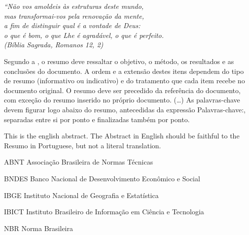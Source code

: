\begin{epigrafe}
    \vspace*{\fill}
	\begin{flushright}
		\textit{``Não vos amoldeis às estruturas deste mundo, \\
		mas transformai-vos pela renovação da mente, \\
		a fim de distinguir qual é a vontade de Deus: \\
		o que é bom, o que Lhe é agradável, o que é perfeito.\\
		(Bíblia Sagrada, Romanos 12, 2)}
	\end{flushright}
\end{epigrafe}


\begin{resumo}
 Segundo a , o resumo deve ressaltar o
 objetivo, o método, os resultados e as conclusões do documento. A ordem e a extensão
 destes itens dependem do tipo de resumo (informativo ou indicativo) e do
 tratamento que cada item recebe no documento original. O resumo deve ser
 precedido da referência do documento, com exceção do resumo inserido no
 próprio documento. (\ldots) As palavras-chave devem figurar logo abaixo do
 resumo, antecedidas da expressão Palavras-chave:, separadas entre si por
 ponto e finalizadas também por ponto.
\end{resumo}

\begin{Abstract}
 This is the english abstract. The Abstract in English should be faithful to the
 Resumo in Portuguese, but not a literal translation.
\end{Abstract}

\listoffigures*
\cleardoublepage

\listoftables*
\cleardoublepage

\begin{siglas}
  \item[ABNT] Associação Brasileira de Normas Técnicas
  \item[BNDES] Banco Nacional de Desenvolvimento Econômico e Social
  \item[IBGE] Instituto Nacional de Geografia e Estatística
  \item[IBICT] Instituto Brasileiro de Informação em Ciência e Tecnologia
  \item[NBR] Norma Brasileira
\end{siglas}



